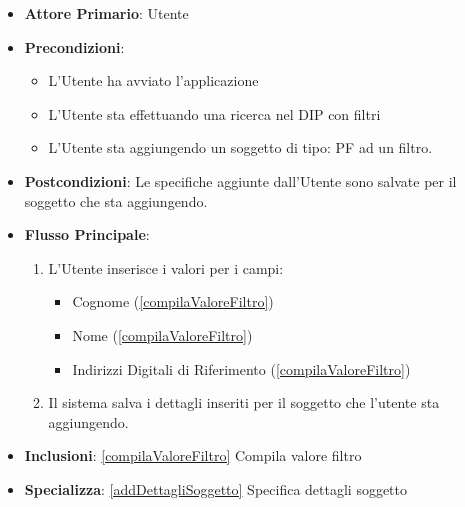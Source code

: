 \begin{itemize}
      \item \textbf{Attore Primario}: Utente
      \item \textbf{Precondizioni}: \begin{itemize}
            \item L'Utente ha avviato l'applicazione
            \item L'Utente sta effettuando una ricerca nel DIP con filtri
            \item L'Utente sta aggiungendo un soggetto di tipo: PF ad un filtro.
      \end{itemize}
      \item \textbf{Postcondizioni}:  Le specifiche aggiunte dall'Utente sono salvate per il soggetto che sta aggiungendo.
      \item \textbf{Flusso Principale}:
            \begin{enumerate}
                  \item  L'Utente inserisce i valori per i campi:
                        \begin{itemize}
                              \item Cognome (\ref{compilaValoreFiltro})
                              \item Nome (\ref{compilaValoreFiltro})
                              \item Indirizzi Digitali di Riferimento (\ref{compilaValoreFiltro})
                        \end{itemize}
                  \item Il sistema salva i dettagli inseriti per il soggetto che l'utente sta aggiungendo.
            \end{enumerate}
      \item \textbf{Inclusioni}: \ref{compilaValoreFiltro} Compila valore filtro
      \item \textbf{Specializza}: \ref{addDettagliSoggetto} Specifica dettagli soggetto
\end{itemize}

